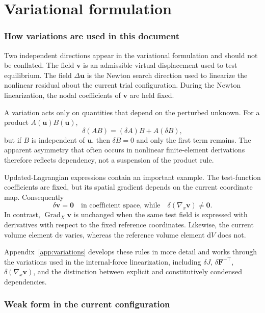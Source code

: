 \documentclass[11pt,a4paper]{article}
\newcommand{\bs}[1]{\boldsymbol{#1}}
\newcommand{\dd}{\mathrm{d}}
\newcommand{\Grad}{\operatorname{Grad}}
\newcommand{\F}{\bs{F}}
\begin{document}
\part{Variational formulation}
\section{How variations are used in this document}
\label{sec:variation-primer}

Two independent directions appear in the variational formulation and should not be conflated. The field $\bs v$ is an admissible virtual displacement used to test equilibrium. The field $\Delta\bs u$ is the Newton search direction used to linearize the nonlinear residual about the current trial configuration. During the Newton linearization, the nodal coefficients of $\bs v$ are held fixed.

A variation acts only on quantities that depend on the perturbed unknown. For a product $A(\bs u)B(\bs u)$,
\begin{equation}
\delta(AB)=(\delta A)B+A(\delta B),
\end{equation}
but if $B$ is independent of $\bs u$, then $\delta B=0$ and only the first term remains. The apparent asymmetry that often occurs in nonlinear finite-element derivations therefore reflects dependency, not a suspension of the product rule.

Updated-Lagrangian expressions contain an important example. The test-function coefficients are fixed, but its spatial gradient depends on the current coordinate map. Consequently
\begin{equation}
\delta\bs v=\bs0
\quad\text{in coefficient space, while}\quad
\delta(\nabla_x\bs v)\neq\bs0.
\end{equation}
In contrast, $\Grad_X\bs v$ is unchanged when the same test field is expressed with derivatives with respect to the fixed reference coordinates. Likewise, the current volume element $\dd v$ varies, whereas the reference volume element $\dd V$ does not.

Appendix~\ref{app:variations} develops these rules in more detail and works through the variations used in the internal-force linearization, including $\delta J$, $\delta\F^{-\top}$, $\delta(\nabla_x\bs v)$, and the distinction between explicit and constitutively condensed dependencies.

\section{Weak form in the current configuration}
\end{document}
